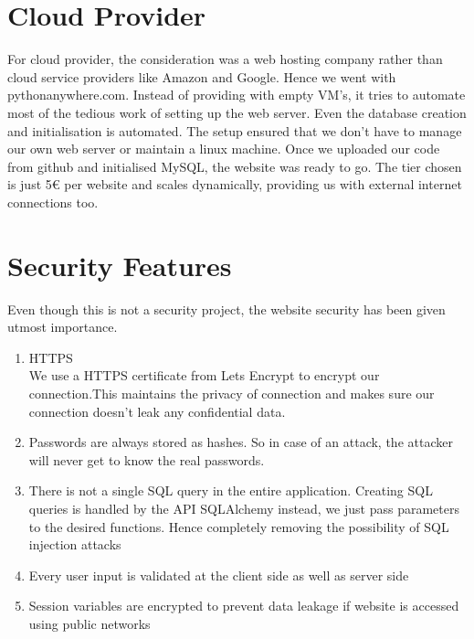 

\section{Cloud Provider}
For cloud provider, the consideration was a web hosting company rather than cloud service providers like Amazon and Google. Hence we went with pythonanywhere.com. Instead of providing with empty VM's, it tries to automate most of the tedious work of setting up the web server. Even the database creation and initialisation is automated. 
The setup ensured that we don't have to manage our own web server or maintain a linux machine. Once we uploaded our code from github and initialised MySQL, the website was ready to go.
The tier chosen is just 5€ per website and scales dynamically, providing us with external internet connections too.

\section{Security Features}
Even though this is not a security project, the website security has been given utmost importance.
\begin{enumerate}
    \item HTTPS
    \\ We use a HTTPS certificate from Lets Encrypt to encrypt our connection.This maintains the privacy of connection and makes sure our connection doesn't leak any confidential data.
    \item Passwords are always stored as hashes. So in case of an attack, the attacker will never get to know the real passwords.
    \item There is not a single SQL query in the entire application. Creating SQL queries is handled by the API SQLAlchemy instead, we just pass parameters to the desired functions. Hence completely removing the possibility of SQL injection attacks
    \item Every user input is validated at the client side as well as server side
    \item Session variables are encrypted to prevent data leakage if website is accessed using public networks
\end{enumerate}

